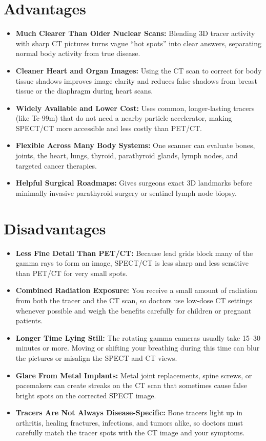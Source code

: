 \section{Advantages}
\begin{itemize}
    \item \textbf{Much Clearer Than Older Nuclear Scans:} Blending 3D tracer activity with sharp CT pictures turns vague ``hot spots'' into clear answers, separating normal body activity from true disease.
    \item \textbf{Cleaner Heart and Organ Images:} Using the CT scan to correct for body tissue shadows improves image clarity and reduces false shadows from breast tissue or the diaphragm during heart scans.
    \item \textbf{Widely Available and Lower Cost:} Uses common, longer-lasting tracers (like Tc-99m) that do not need a nearby particle accelerator, making SPECT/CT more accessible and less costly than PET/CT.
    \item \textbf{Flexible Across Many Body Systems:} One scanner can evaluate bones, joints, the heart, lungs, thyroid, parathyroid glands, lymph nodes, and targeted cancer therapies.
    \item \textbf{Helpful Surgical Roadmaps:} Gives surgeons exact 3D landmarks before minimally invasive parathyroid surgery or sentinel lymph node biopsy.
\end{itemize}

\section{Disadvantages}
\begin{itemize}
    \item \textbf{Less Fine Detail Than PET/CT:} Because lead grids block many of the gamma rays to form an image, SPECT/CT is less sharp and less sensitive than PET/CT for very small spots.
    \item \textbf{Combined Radiation Exposure:} You receive a small amount of radiation from both the tracer and the CT scan, so doctors use low-dose CT settings whenever possible and weigh the benefits carefully for children or pregnant patients.
    \item \textbf{Longer Time Lying Still:} The rotating gamma cameras usually take 15--30 minutes or more. Moving or shifting your breathing during this time can blur the pictures or misalign the SPECT and CT views.
    \item \textbf{Glare From Metal Implants:} Metal joint replacements, spine screws, or pacemakers can create streaks on the CT scan that sometimes cause false bright spots on the corrected SPECT image.
    \item \textbf{Tracers Are Not Always Disease-Specific:} Bone tracers light up in arthritis, healing fractures, infections, and tumors alike, so doctors must carefully match the tracer spots with the CT image and your symptoms.
\end{itemize}

